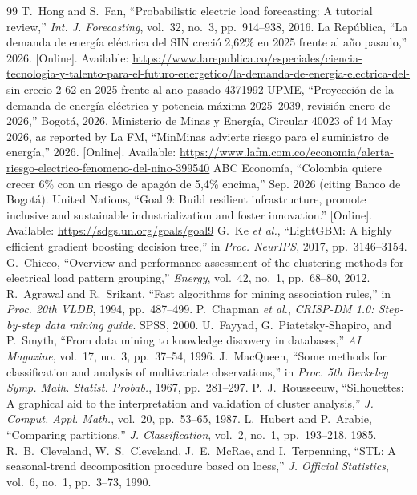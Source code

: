 \documentclass[conference,10pt]{IEEEtran}
\begin{document}
\begin{thebibliography}{99}
 T.~Hong and S.~Fan, ``Probabilistic electric load forecasting: A tutorial review,'' \emph{Int. J. Forecasting}, vol.~32, no.~3, pp.~914--938, 2016.
 La Rep\'ublica, ``La demanda de energ\'ia el\'ectrica del SIN creci\'o 2,62\% en 2025 frente al a\~no pasado,'' 2026. [Online]. Available: \url{https://www.larepublica.co/especiales/ciencia-tecnologia-y-talento-para-el-futuro-energetico/la-demanda-de-energia-electrica-del-sin-crecio-2-62-en-2025-frente-al-ano-pasado-4371992}
 UPME, ``Proyecci\'on de la demanda de energ\'ia el\'ectrica y potencia m\'axima 2025--2039, revisi\'on enero de 2026,'' Bogot\'a, 2026.
 Ministerio de Minas y Energ\'ia, Circular 40023 of 14 May 2026, as reported by La FM, ``MinMinas advierte riesgo para el suministro de energ\'ia,'' 2026. [Online]. Available: \url{https://www.lafm.com.co/economia/alerta-riesgo-electrico-fenomeno-del-nino-399540}
 ABC Econom\'ia, ``Colombia quiere crecer 6\% con un riesgo de apag\'on de 5,4\% encima,'' Sep. 2026 (citing Banco de Bogot\'a).
 United Nations, ``Goal 9: Build resilient infrastructure, promote inclusive and sustainable industrialization and foster innovation.'' [Online]. Available: \url{https://sdgs.un.org/goals/goal9}
 G.~Ke \emph{et al.}, ``LightGBM: A highly efficient gradient boosting decision tree,'' in \emph{Proc. NeurIPS}, 2017, pp.~3146--3154.
 G.~Chicco, ``Overview and performance assessment of the clustering methods for electrical load pattern grouping,'' \emph{Energy}, vol.~42, no.~1, pp.~68--80, 2012.
 R.~Agrawal and R.~Srikant, ``Fast algorithms for mining association rules,'' in \emph{Proc. 20th VLDB}, 1994, pp.~487--499.
 P.~Chapman \emph{et al.}, \emph{CRISP-DM 1.0: Step-by-step data mining guide}. SPSS, 2000.
 U.~Fayyad, G.~Piatetsky-Shapiro, and P.~Smyth, ``From data mining to knowledge discovery in databases,'' \emph{AI Magazine}, vol.~17, no.~3, pp.~37--54, 1996.
 J.~MacQueen, ``Some methods for classification and analysis of multivariate observations,'' in \emph{Proc. 5th Berkeley Symp. Math. Statist. Probab.}, 1967, pp.~281--297.
 P.~J.~Rousseeuw, ``Silhouettes: A graphical aid to the interpretation and validation of cluster analysis,'' \emph{J. Comput. Appl. Math.}, vol.~20, pp.~53--65, 1987.
 L.~Hubert and P.~Arabie, ``Comparing partitions,'' \emph{J. Classification}, vol.~2, no.~1, pp.~193--218, 1985.
 R.~B.~Cleveland, W.~S.~Cleveland, J.~E.~McRae, and I.~Terpenning, ``STL: A seasonal-trend decomposition procedure based on loess,'' \emph{J. Official Statistics}, vol.~6, no.~1, pp.~3--73, 1990.
\end{thebibliography}
\end{document}
